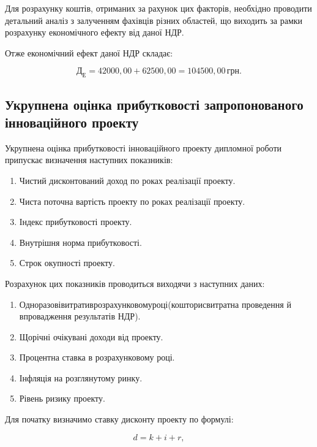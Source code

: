 Для розрахунку коштів, отриманих за рахунок цих факторів, необхідно проводити детальний аналіз з залученням фахівців різних областей, що виходить за рамки розрахунку економічного ефекту від даної НДР.

Отже економічний ефект даної НДР складає:

\[
	\text{Д}_{\text{Е}} = 42000,00 + 62500,00 = 104500,00 \, \text{грн}.
\]

\vspace{1.5em}

\subsection{Укрупнена оцінка прибутковості запропонованого інноваційного проекту}

Укрупнена оцінка прибутковості інноваційного проекту дипломної роботи припускає визначення наступних показників:

\begin{enumerate}
	\item Чистий дисконтований доход по роках реалізації проекту.
	\item Чиста поточна вартість проекту по роках реалізації проекту.
	\item Індекс прибутковості проекту.
	\item Внутрішня норма прибутковості.
	\item Строк окупності проекту.
\end{enumerate}

Розрахунок цих показників проводиться виходячи з наступних даних:

\begin{enumerate}
	\item Одноразові\hfill витрати\hfill в\hfill розрахунковому\hfill році\hfill (кошторис\hfill витрат\hfill на\newline \hspace*{-20mm} проведення й впровадження результатів НДР).
	\item Щорічні очікувані доходи від проекту.
	\item Процентна ставка в розрахунковому році.
	\item Інфляція на розглянутому ринку.
	\item Рівень ризику проекту.
\end{enumerate}

Для початку визначимо ставку дисконту проекту по формулі:

\begin{equation}\label{eq:economy12}
	d = k + i + r,
\end{equation}

